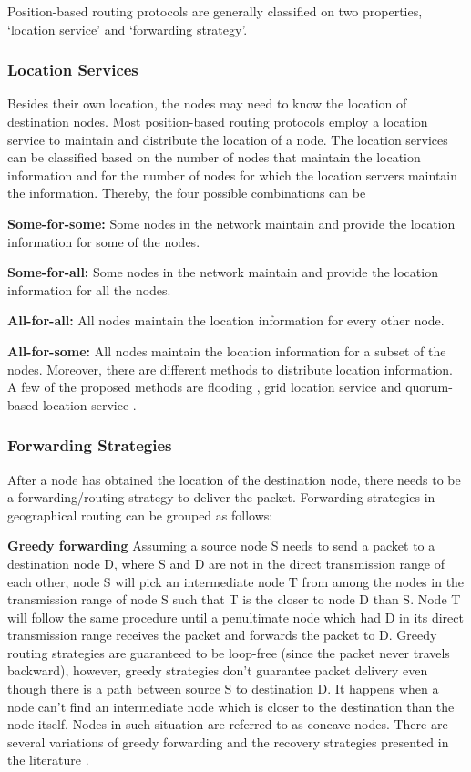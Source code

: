 Position-based routing protocols are generally classified on two properties, `location service' and `forwarding strategy'.

\subsubsection{Location Services} \label{loc_service}
Besides their own location, the nodes may need to know the location of destination nodes. Most position-based routing protocols employ a location service to maintain and distribute the location of a node. The location services can be classified based on the number of nodes that maintain the location information and for the number of nodes for which the location servers maintain the information. Thereby, the four possible combinations can be \cite{967595}

\textbf{Some-for-some:} Some nodes in the network maintain and provide the location information for some of the nodes.

\textbf{Some-for-all:} Some nodes in the network maintain and provide the location information for all the nodes.

\textbf{All-for-all:} All nodes maintain the location information for every other node.

\textbf{All-for-some:} All nodes maintain the location information for a subset of the nodes. 
Moreover, there are different methods to distribute location information. A few of the proposed methods are flooding \cite{Basagni:1998:DRE:288235.288254}, grid location service \cite{Li:2000:SLS:345910.345931} and quorum-based location service \cite{769770}.

\subsubsection{Forwarding Strategies}
After a node has obtained the location of the destination node, there needs to be a forwarding/routing strategy to deliver the packet. Forwarding strategies in geographical routing can be grouped as follows:

\textbf{Greedy forwarding} Assuming a source node S needs to send a packet to a destination node D, where S and D are not in the direct transmission range of each other, node S will pick an intermediate node T from among the nodes in the transmission range of node S such that T is the closer to node D than S. Node T will follow the same procedure until a penultimate node which had D in its direct transmission range receives the packet and forwards the packet to D. 
Greedy routing strategies are guaranteed to be loop-free (since the packet never travels backward), however, greedy strategies don't guarantee packet delivery even though there is a path between source S to destination D. It happens when a node can't find an intermediate node which is closer to the destination than the node itself. Nodes in such situation are referred to as concave nodes. There are several variations of greedy forwarding and the recovery strategies presented in the literature \cite{OUBBATI201729} \cite{6238283} \cite{967595} \cite{Stojmenovic:2002:PRA:2288474.2290160}.

